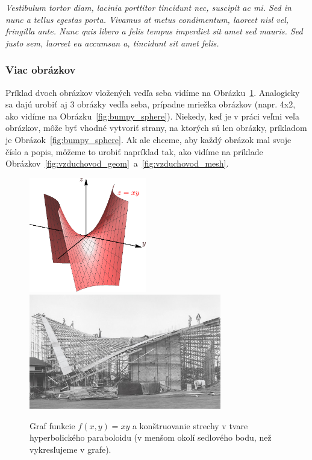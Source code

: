 \textit{Vestibulum tortor diam, lacinia porttitor tincidunt nec, suscipit ac mi. Sed in nunc a tellus egestas porta. Vivamus at metus condimentum, laoreet nisl vel, fringilla ante. Nunc quis libero a felis tempus imperdiet sit amet sed mauris. Sed justo sem, laoreet eu accumsan a, tincidunt sit amet felis.}


\subsubsection{Viac obrázkov}

Príklad dvoch obrázkov vložených vedľa seba vidíme na Obrázku~\ref{fig:hyperbolicky_paraboloid}. Analogicky sa dajú urobiť aj 3 obrázky vedľa seba, prípadne mriežka obrázkov (napr. 4x2, ako vidíme na Obrázku~\ref{fig:bumpy_sphere}). Niekedy, keď je v práci veľmi veľa obrázkov, môže byť vhodné vytvoriť strany, na ktorých sú len obrázky, príkladom je Obrázok~\ref{fig:bumpy_sphere}. Ak ale chceme, aby každý obrázok mal svoje číslo a popis, môžeme to urobiť napríklad tak, ako vidíme na príklade Obrázkov~\ref{fig:vzduchovod_geom}~a~\ref{fig:vzduchovod_mesh}.
\begin{figure}[!h]
	\centering
	\includegraphics[height=5cm]{fig_hyperbolicky_paraboloid}
	\quad
	\includegraphics[height=5cm]{st_chas_framing}
	\caption{Graf funkcie $f(x,y)=xy$ a konštruovanie strechy v tvare hyperbolického paraboloidu (v menšom okolí sedlového bodu, než vykresľujeme v grafe).} \label{fig:hyperbolicky_paraboloid}
\end{figure}

